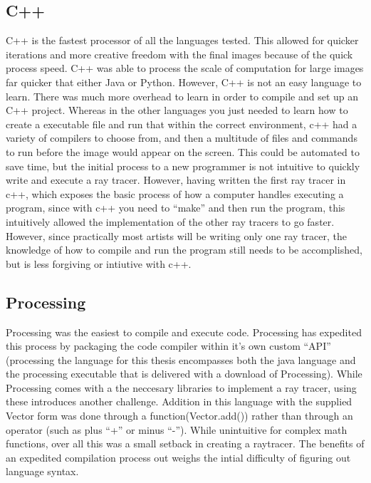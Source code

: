 \subsection{C++}
C++ is the fastest processor of all the languages tested.  This allowed for quicker iterations and more creative freedom with the final images because of the quick process speed.  C++ was able to process the scale of computation for large images far quicker that either Java or Python.  However, C++ is not an easy language to learn.  There was much more overhead to learn in order to compile and set up an C++ project.  Whereas in the other languages you just needed to learn how to create a executable file and run that within the correct environment, c++ had a variety of compilers to choose from, and then a multitude of files and commands to run before the image would appear on the screen.  This could be automated to save time, but the initial process to a new programmer is not intuitive to quickly write and execute a ray tracer.  However, having written the first ray tracer in c++, which exposes the basic process of how a computer handles executing a program, since with c++ you need to ``make'' and then run the program, this intuitively allowed the implementation of the other ray tracers to go faster.  However, since practically most artists will be writing only one ray tracer, the knowledge of how to compile and run the program still needs to be accomplished, but is less forgiving or intiutive with c++.

\subsection{Processing}
Processing was the easiest to compile and execute code.  Processing has expedited this process by packaging the code compiler within it's own custom ``API'' (processing the language for this thesis encompasses both the java language and the processing executable that is delivered with a download of Processing).  While Processing comes with a the neccesary libraries to implement a ray tracer, using these introduces another challenge.  Addition in this language with the supplied Vector form was done through a function(Vector.add()) rather than through an operator (such as plus ``+'' or minus ``-'').  While unintuitive for complex math functions, over all this was a small setback in creating a raytracer.  The benefits of an expedited compilation process out weighs the intial difficulty of figuring out language syntax.

